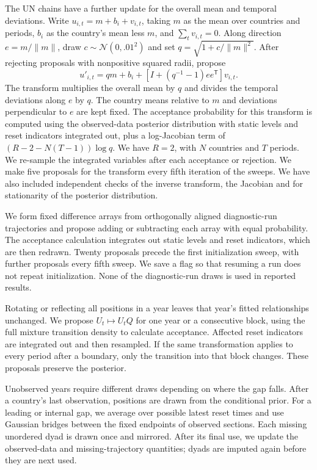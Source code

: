 \documentclass[10pt,authoryear]{elsarticle}
\begin{document}
The UN chains have a further update for the overall mean and temporal deviations. Write $u_{i,t}=m+b_i+v_{i,t}$, taking $m$ as the mean over countries and periods, $b_i$ as the country's mean less $m$, and $\sum_t v_{i,t}=0$. Along direction $e=m/\|m\|$, draw $c\sim\mathcal N(0,.01^2)$ and set $q=\sqrt{1+c/\|m\|^2}$. After rejecting proposals with nonpositive squared radii, propose
\[
u'_{i,t}=qm+b_i+\left[I+(q^{-1}-1)ee^{\mathsf T}\right]v_{i,t}.
\]
The transform multiplies the overall mean by $q$ and divides the temporal deviations along $e$ by $q$. The country means relative to $m$ and deviations perpendicular to $e$ are kept fixed. The acceptance probability for this transform is computed using the observed-data posterior distribution with static levels and reset indicators integrated out, plus a log-Jacobian term of $(R-2-N(T-1))\log q$. We have $R=2$, with $N$ countries and $T$ periods. We re-sample the integrated variables after each acceptance or rejection. We make five proposals for the transform every fifth iteration of the sweeps. We have also included independent checks of the inverse transform, the Jacobian and for stationarity of the posterior distribution.

We form fixed difference arrays from orthogonally aligned diagnostic-run trajectories and propose adding or subtracting each array with equal probability. The acceptance calculation integrates out static levels and reset indicators, which are then redrawn. Twenty proposals precede the first initialization sweep, with further proposals every fifth sweep. We save a flag so that resuming a run does not repeat initialization. None of the diagnostic-run draws is used in reported results.

Rotating or reflecting all positions in a year leaves that year's fitted relationships unchanged. We propose $U_t\mapsto U_tQ$ for one year or a consecutive block, using the full mixture transition density to calculate acceptance. Affected reset indicators are integrated out and then resampled. If the same transformation applies to every period after a boundary, only the transition into that block changes. These proposals preserve the posterior.

Unobserved years require different draws depending on where the gap falls. After a country's last observation, positions are drawn from the conditional prior. For a leading or internal gap, we average over possible latest reset times and use Gaussian bridges between the fixed endpoints of observed sections. Each missing unordered dyad is drawn once and mirrored. After its final use, we update the observed-data and missing-trajectory quantities; dyads are imputed again before they are next used.
\end{document}
